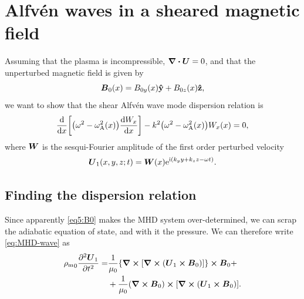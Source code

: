 \documentclass[11pt,a4paper, 
swedish, english %
]{article}
\newcommand{\rhom}{\ensuremath{{\rho_{\text{m}}}}}
\begin{document}
\section{Alfvén waves in a sheared magnetic field}
\newcommand{\wA}{\omega_{\text{A}}}
Assuming that the plasma is incompressible, $\div\vb*U=0$, and that
the unperturbed magnetic field is given by
\begin{equation}\label{eq5:B0}
\vb*B_0(x)=B_{0y}(x)\vu{y}+B_{0z}(x)\vu{z},
\end{equation}
we want to show that the shear Alfvén wave mode dispersion relation is
\begin{equation}\label{eq5:want}
\dv{x}\qty[\qty(\omega^2-\wA^2(x))\dv{W_x}{x}]
-k^2\qty(\omega^2-\wA^2(x))W_x(x)=0,
\end{equation}
where $\vb*W$ is the sesqui-Fourier amplitude of the first order
perturbed velocity
\begin{equation}
\vb*U_1(x, y, z; t) = \vb*W(x)\mathrm{e}^{\mathrm{i}(k_yy+k_zz-\omega t)}.
\end{equation}

\subsection{Finding the dispersion relation}
Since apparently \eqref{eq5:B0} makes the MHD system over-determined,
we can scrap the adiabatic equation of state, and with it the
pressure.\footnotemark{} We can therefore write \eqref{eq:MHD-wave} as
\begin{equation}
\begin{aligned}
\rhom_0\pdv[2]{\vb*U_1}{t} =& 
\frac{1}{\mu_0}\qty{\curl\qty[\curl\qty(\vb*U_1\cross\vb*B_0)]}
\cross\vb*B_0+\\
&+\frac{1}{\mu_0}(\curl\vb*B_0)\cross
\qty[\curl\qty(\vb*U_1\cross\vb*B_0)].
\end{aligned}
\end{equation}
\end{document}
